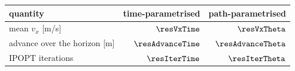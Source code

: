 \begin{tabular}{lrr}
  \toprule
  quantity & time-parametrised & path-parametrised \\
  \midrule
  mean $v_x$ [m/s] & $\resVxTime$ & $\resVxTheta$ \\
  advance over the horizon [m] & $\resAdvanceTime$ & $\resAdvanceTheta$ \\
  IPOPT iterations & $\resIterTime$ & $\resIterTheta$ \\
  \bottomrule
\end{tabular}
